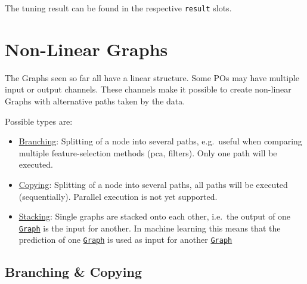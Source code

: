 \documentclass[
]{scrbook}
\newenvironment{Shaded}{\begin{snugshade}}{\end{snugshade}}
\newcommand{\NormalTok}[1]{#1}
\newcommand{\SpecialCharTok}[1]{\textcolor[rgb]{0.00,0.00,0.00}{#1}}
\providecommand{\tightlist}{%
  \setlength{\itemsep}{0pt}\setlength{\parskip}{0pt}}
\renewenvironment{Shaded} {\begin{snugshade}\small} {\end{snugshade}}
\begin{document}
The tuning result can be found in the respective \texttt{result} slots.

\begin{Shaded}
\end{Shaded}

\hypertarget{pipe-nonlinear}{%
\section{Non-Linear Graphs}\label{pipe-nonlinear}}

The Graphs seen so far all have a linear structure.
Some POs may have multiple input or output channels.
These channels make it possible to create non-linear Graphs with alternative paths taken by the data.

Possible types are:

\begin{itemize}
\tightlist
\item
  \protect\hyperlink{pipe-model-ensembles-branching-copying}{Branching}:
  Splitting of a node into several paths, e.g.~useful when comparing multiple feature-selection methods (pca, filters).
  Only one path will be executed.
\item
  \protect\hyperlink{pipe-model-ensembles-branching-copying}{Copying}:
  Splitting of a node into several paths, all paths will be executed (sequentially).
  Parallel execution is not yet supported.
\item
  \protect\hyperlink{pipe-model-ensembles-stacking}{Stacking}:
  Single graphs are stacked onto each other, i.e.~the output of one \href{https://mlr3pipelines.mlr-org.com/reference/Graph.html}{\texttt{Graph}} is the input for another.
  In machine learning this means that the prediction of one \href{https://mlr3pipelines.mlr-org.com/reference/Graph.html}{\texttt{Graph}} is used as input for another \href{https://mlr3pipelines.mlr-org.com/reference/Graph.html}{\texttt{Graph}}
\end{itemize}

\hypertarget{pipe-model-ensembles-branching-copying}{%
\subsection{Branching \& Copying}\label{pipe-model-ensembles-branching-copying}}
\end{document}
